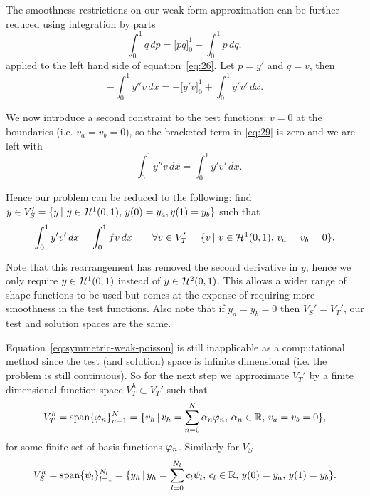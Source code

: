 The smoothness restrictions on our weak form approximation can be further reduced using integration by parts
\begin{equation*}
  \int_{0}^{1}q\, dp=\Big[pq\Big]_{0}^{1}-\int_{0}^{1}p\, dq,
\end{equation*}
applied to the left hand side of equation~\eqref{eq:26}. Let $p=y'$ and $q=v$, then
\begin{equation}
  -\int_{0}^{1}y''v\, dx=-\Big[y'v\Big]_{0}^{1}+\int_{0}^{1}y'v'\, dx.
  \label{eq:29}
\end{equation}

We now introduce a second constraint to the test functions: $v=0$
at the boundaries (i.e. $v_a=v_b=0$), so the bracketed term in \eqref{eq:29} is
zero and we are left with
\begin{equation*}
  -\int_{0}^{1}y''v\, dx=\int_{0}^{1}y'v'\, dx.
\end{equation*}

Hence our problem can be reduced to the following: find $y\in V_{S}'=\{y \,|\, \, y \in \mathcal{H}^1(0,1),\, y(0) = y_a, y(1) = y_b \}$
such that
\begin{equation}
  \int_{0}^{1}y'v'\, dx=\int_{0}^{1}fv\, dx\qquad\forall v\in V'_{T}=\{v \,|\, \, v \in \mathcal{H}^1(0,1),\, v_a=v_b=0\}.\label{eq:symmetric-weak-poisson}
\end{equation}

Note that this rearrangement has removed the second derivative in $y$, hence we only require $y \in \mathcal{H}^1(0,1)$ instead of $y \in \mathcal{H}^2(0,1)$. This allows a wider range of shape
functions to be used but comes at the expense of requiring more smoothness in
the test functions. Also note that if $y_a = y_b = 0$ then $V_{S}'=V_{T}'$, our
test and solution spaces are the same.

Equation~\eqref{eq:symmetric-weak-poisson} is still inapplicable as a
computational method since the test (and solution) space is infinite dimensional
(i.e. the problem is still continuous). So for the next step we approximate
$V_{T}'$ by a finite dimensional function space $V_{T}^{h}\subset V_{T}'$ such
that
\begin{equation}
  V_{T}^{h}=\text{span} \{ \varphi_{n} \}_{n=1}^{N}
  =  \{v_h \,|\, v_h = \sum_{n=0}^{N}\alpha_{n} \varphi_{n},\, \alpha_{n} \in \mathbb{R},\, v_a = v_b =0 \},
  \label{eq:30}
\end{equation}
for some finite set of basis functions $\varphi_{n}$. Similarly for $V_S$
\begin{equation}
  \label{eq:34}
    V_{S}^{h}=\text{span} \{ \psi_{l} \}_{l=1}^{N_l}
    =  \{y_h \,|\, y_h = \sum_{l=0}^{N_l}c_{l} \psi_{l},\,
    c_{l} \in \mathbb{R},\, y(0) = y_a,\, y(1) = y_b \}.
\end{equation}

